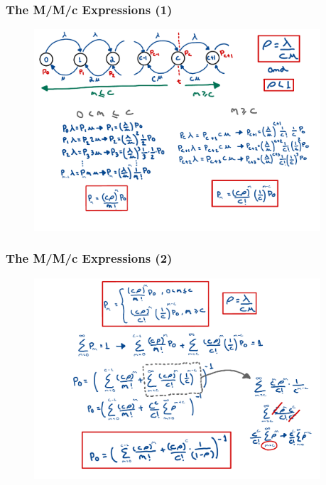 \begin{frame}
    \frametitle{The M/M/c Expressions (1)}
    \begin{figure}
        \centering
        \includegraphics[width=0.95\textwidth]{slides/figures/mmc_equations_one.pdf}
    \end{figure}
\end{frame}

\begin{frame}
    \frametitle{The M/M/c Expressions (2)}
    \begin{figure}
        \centering
        \includegraphics[width=0.95\textwidth]{slides/figures/mmc_equations_two.pdf}
    \end{figure}
\end{frame}


